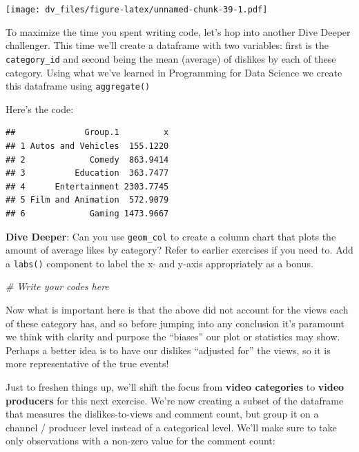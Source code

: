 \documentclass[]{article}
\newenvironment{Shaded}{\begin{snugshade}}{\end{snugshade}}
\newcommand{\CommentTok}[1]{\textcolor[rgb]{0.56,0.35,0.01}{\textit{#1}}}
\newcommand{\DataTypeTok}[1]{\textcolor[rgb]{0.13,0.29,0.53}{#1}}
\newcommand{\KeywordTok}[1]{\textcolor[rgb]{0.13,0.29,0.53}{\textbf{#1}}}
\newcommand{\NormalTok}[1]{#1}
\newcommand{\OperatorTok}[1]{\textcolor[rgb]{0.81,0.36,0.00}{\textbf{#1}}}
\newcommand{\StringTok}[1]{\textcolor[rgb]{0.31,0.60,0.02}{#1}}
\begin{document}
\texttt{[image: dv\_files/figure-latex/unnamed-chunk-39-1.pdf]}

To maximize the time you spent writing code, let's hop into another Dive
Deeper challenger. This time we'll create a dataframe with two
variables: first is the \texttt{category\_id} and second being the mean
(average) of dislikes by each of these category. Using what we've
learned in Programming for Data Science we create this dataframe using
\texttt{aggregate()}

Here's the code:

\begin{Shaded}
\end{Shaded}

\begin{verbatim}
##              Group.1         x
## 1 Autos and Vehicles  155.1220
## 2             Comedy  863.9414
## 3          Education  363.7477
## 4      Entertainment 2303.7745
## 5 Film and Animation  572.9079
## 6             Gaming 1473.9667
\end{verbatim}

\textbf{Dive Deeper}: Can you use \texttt{geom\_col} to create a column
chart that plots the amount of average likes by category? Refer to
earlier exercises if you need to. Add a \texttt{labs()} component to
label the x- and y-axis appropriately as a bonus.

\begin{Shaded}
\begin{Highlighting}[]
\CommentTok{# Write your codes here}
\end{Highlighting}
\end{Shaded}

Now what is important here is that the above did not account for the
views each of these category has, and so before jumping into any
conclusion it's paramount we think with clarity and purpose the
``biases'' our plot or statistics may show. Perhaps a better idea is to
have our dislikes ``adjusted for'' the views, so it is more
representative of the true events!

Just to freshen things up, we'll shift the focus from \textbf{video
categories} to \textbf{video producers} for this next exercise. We're
now creating a subset of the dataframe that measures the
dislikes-to-views and comment count, but group it on a channel /
producer level instead of a categorical level. We'll make sure to take
only observations with a non-zero value for the comment count:
\end{document}
